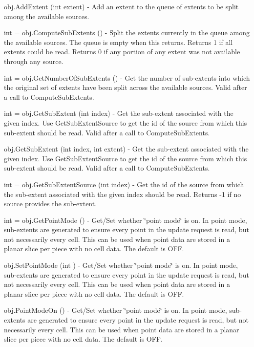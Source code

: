 \begin{DoxyItemize}
\item {\ttfamily obj.\-Add\-Extent (int extent)} -\/ Add an extent to the queue of extents to be split among the available sources.  
\item {\ttfamily int = obj.\-Compute\-Sub\-Extents ()} -\/ Split the extents currently in the queue among the available sources. The queue is empty when this returns. Returns 1 if all extents could be read. Returns 0 if any portion of any extent was not available through any source.  
\item {\ttfamily int = obj.\-Get\-Number\-Of\-Sub\-Extents ()} -\/ Get the number of sub-\/extents into which the original set of extents have been split across the available sources. Valid after a call to Compute\-Sub\-Extents.  
\item {\ttfamily int = obj.\-Get\-Sub\-Extent (int index)} -\/ Get the sub-\/extent associated with the given index. Use Get\-Sub\-Extent\-Source to get the id of the source from which this sub-\/extent should be read. Valid after a call to Compute\-Sub\-Extents.  
\item {\ttfamily obj.\-Get\-Sub\-Extent (int index, int extent)} -\/ Get the sub-\/extent associated with the given index. Use Get\-Sub\-Extent\-Source to get the id of the source from which this sub-\/extent should be read. Valid after a call to Compute\-Sub\-Extents.  
\item {\ttfamily int = obj.\-Get\-Sub\-Extent\-Source (int index)} -\/ Get the id of the source from which the sub-\/extent associated with the given index should be read. Returns -\/1 if no source provides the sub-\/extent.  
\item {\ttfamily int = obj.\-Get\-Point\-Mode ()} -\/ Get/\-Set whether \char`\"{}point mode\char`\"{} is on. In point mode, sub-\/extents are generated to ensure every point in the update request is read, but not necessarily every cell. This can be used when point data are stored in a planar slice per piece with no cell data. The default is O\-F\-F.  
\item {\ttfamily obj.\-Set\-Point\-Mode (int )} -\/ Get/\-Set whether \char`\"{}point mode\char`\"{} is on. In point mode, sub-\/extents are generated to ensure every point in the update request is read, but not necessarily every cell. This can be used when point data are stored in a planar slice per piece with no cell data. The default is O\-F\-F.  
\item {\ttfamily obj.\-Point\-Mode\-On ()} -\/ Get/\-Set whether \char`\"{}point mode\char`\"{} is on. In point mode, sub-\/extents are generated to ensure every point in the update request is read, but not necessarily every cell. This can be used when point data are stored in a planar slice per piece with no cell data. The default is O\-F\-F.  

\end{DoxyItemize}
